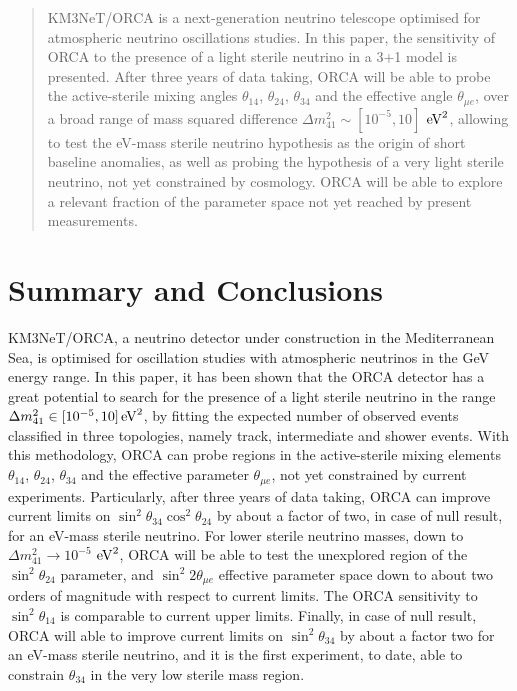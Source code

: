 \documentclass[preprint,12pt]{elsarticle}
\def\eV{\rm{eV}^2}
\newcommand{\dmf}{\Delta m^2_{41}}
\begin{document}
\begin{frontmatter}
\begin{abstract}
KM3NeT/ORCA is a next-generation neutrino telescope optimised for atmospheric neutrino oscillations studies. In this paper, the sensitivity of ORCA to the presence of a light sterile neutrino in a 3+1 model is presented. After three years of data taking, ORCA will be able to probe the active-sterile mixing angles $\theta_{14}$, $\theta_{24}$, $\theta_{34}$ and the effective angle $\theta_{\mu e}$, over a broad range of mass squared difference $\dmf \sim [10^{-5}, 10]$ $\eV$, allowing to test the eV-mass sterile neutrino hypothesis as the origin of short baseline anomalies, as well as probing the hypothesis of a very light sterile neutrino, not yet constrained by cosmology. ORCA will be able to explore a relevant fraction of the parameter space not yet reached by present measurements. 
\end{abstract}


\end{frontmatter}













\section{Summary and Conclusions}
\label{sec:summary}
KM3NeT/ORCA, a neutrino detector under construction in the Mediterranean Sea, is optimised for oscillation studies with atmospheric neutrinos in the GeV energy range. In this paper, it has been shown that the ORCA detector has a great potential to search for the presence of a light sterile neutrino in the range $\dmf \in [10^{-5}, 10] \, \eV$, by fitting the expected number of observed events classified in three topologies, namely track, intermediate and shower events. With this methodology, ORCA can probe regions in the active-sterile mixing elements $\theta_{14}$, $\theta_{24}$, $\theta_{34}$ and the effective parameter $\theta_{\mu e}$, not yet constrained by current experiments. Particularly, after three years of data taking, ORCA can improve current limits on $\sin^2\theta_{34} \cos^2 \theta_{24}$ by about a factor of two, in case of null result, for an eV-mass sterile neutrino. For lower sterile neutrino masses, down to $\dmf \rightarrow 10^{-5}$ $\eV$, ORCA will be able to test the unexplored region of the $\sin^2\theta_{24}$ parameter, and $\sin^2 2\theta_{\mu e}$ effective parameter space down to about two orders of magnitude with respect to current limits. The ORCA sensitivity to $\sin^2\theta_{14}$ is comparable to current upper limits. Finally, in case of null result, ORCA will able to improve current limits on $\sin^2\theta_{34}$ by about a factor two for an eV-mass sterile neutrino, and it is the first experiment, to date, able to constrain $\theta_{34}$ in the very low sterile mass region. 
\end{document}
